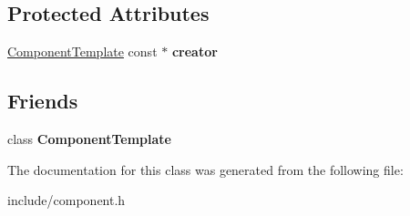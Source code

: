\subsection*{\-Protected \-Attributes}
\begin{DoxyCompactItemize}
\item 
\hypertarget{classNamedComponent_a83faa22f3cb9119b7794e41a05c5c2af}{
\hyperlink{classComponentTemplate}{\-Component\-Template} const $\ast$ {\bfseries creator}}
\label{df/d5f/classNamedComponent_a83faa22f3cb9119b7794e41a05c5c2af}

\end{DoxyCompactItemize}
\subsection*{\-Friends}
\begin{DoxyCompactItemize}
\item 
\hypertarget{classNamedComponent_a5a3f782f4aae501c20a34782828e96b9}{
class {\bfseries \-Component\-Template}}
\label{df/d5f/classNamedComponent_a5a3f782f4aae501c20a34782828e96b9}

\end{DoxyCompactItemize}


\-The documentation for this class was generated from the following file\-:\begin{DoxyCompactItemize}
\item 
include/component.\-h\end{DoxyCompactItemize}

